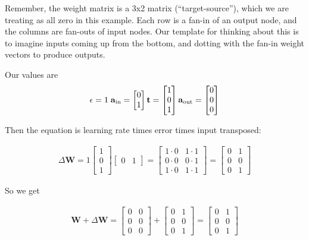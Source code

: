 Remember, the weight matrix is a 3x2 matrix  (``target-source''), which we are treating as all zero in this example. Each row is a fan-in of an output node, and the columns are fan-outs of input nodes. Our template for thinking about this is to imagine inputs coming up from the bottom, and dotting with the fan-in weight vectors to produce outputs.

Our values are
\begin{equation*}
\epsilon = 1 \; \; \\
\mathbf{a}_{\text{in}} = \begin{bmatrix} 0 \\ 1 \end{bmatrix} \\
\mathbf{t} = \begin{bmatrix} 1 \\ 0 \\ 1 \end{bmatrix}
\mathbf{a}_{\text{out}} = \begin{bmatrix} 0 \\ 0 \\ 0 \end{bmatrix}
\end{equation*}

Then the equation is learning rate times error times input transposed:

\begin{align*}
\Delta \mathbf{W}  = 1
\begin{bmatrix} 1 \\ 0 \\ 1 \end{bmatrix} 
\begin{bmatrix} 0 & 1 \end{bmatrix} 
= \begin{bmatrix} 1 \cdot 0 & 1 \cdot 1 \\ 0 \cdot 0 & 0 \cdot 1 \\ 1 \cdot 0 & 1 \cdot 1 \end{bmatrix} 
= \begin{bmatrix} 0 & 1 \\ 0 & 0 \\  0 & 1  \end{bmatrix}
\end{align*}

So we get

\begin{align*}
\mathbf{W} + \Delta \mathbf{W}  =
\begin{bmatrix} 0 & 0 \\ 0 & 0 \\  0  & 0  \end{bmatrix} +
\begin{bmatrix} 0 & 1 \\ 0 & 0 \\  0  & 1  \end{bmatrix} =
\begin{bmatrix} 0 & 1 \\ 0 & 0 \\  0  & 1  \end{bmatrix}
\end{align*}

